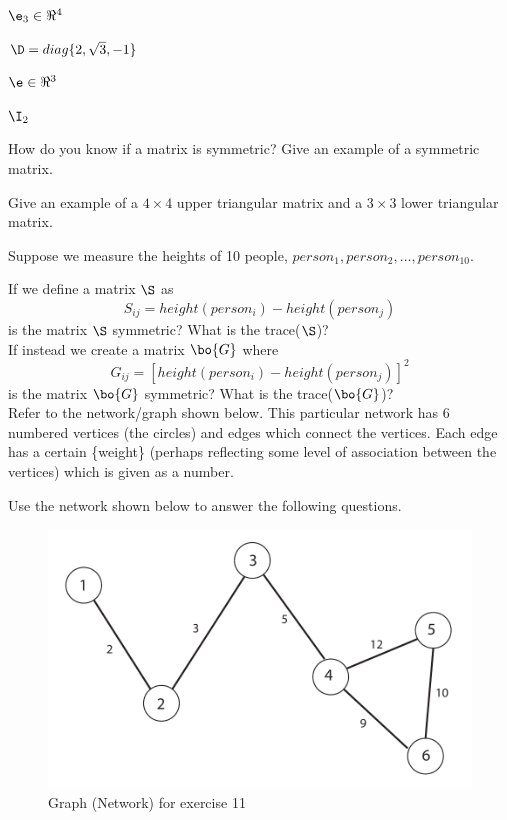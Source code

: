 \documentclass[
]{article}
\theoremstyle{definition}
\theoremstyle{definition}
\theoremstyle{definition}
\theoremstyle{definition}
\theoremstyle{remark}
\begin{document}
\(\e_3 \in \Re^4\)

\(\D=diag\{2, \sqrt{3}, -1\}\)

\(\e \in \Re^3\)

\(\I_2\)

How do you know if a matrix is symmetric? Give an example of a symmetric matrix.

Give an example of a \(4\times 4\) upper triangular matrix and a \(3\times 3\) lower triangular matrix.

Suppose we measure the heights of 10 people, \(person_1, person_2, \dots, person_{10}\).

If we define a matrix \(\S\) as
\[S_{ij} = height(person_i) - height(person_j)\]
is the matrix \(\S\) symmetric? What is the trace(\(\S\))?\\

If instead we create a matrix \(\bo{G}\) where
\[G_{ij} = [height(person_i) - height(person_j)]^2\]
is the matrix \(\bo{G}\) symmetric? What is the trace(\(\bo{G}\))?\\

Refer to the network/graph shown below. This particular network has 6 numbered vertices (the circles) and edges which connect the vertices. Each edge has a certain \{weight\} (perhaps reflecting some level of association between the vertices) which is given as a number.

Use the network shown below to answer the following questions.\\

\begin{figure}

{\centering \includegraphics[width=80.93in]{figs/graphex} 

}

\caption{Graph (Network) for exercise 11}\label{fig:unnamed-chunk-8}
\end{figure}
\end{document}
